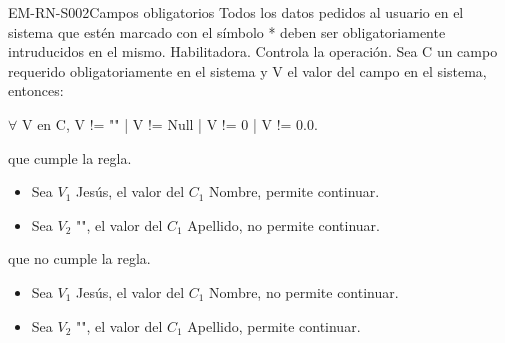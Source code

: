 \begin{BussinesRule}{EM-RN-S002}{Campos obligatorios}
	\BRitem[Descripción:]Todos los datos pedidos al usuario en el sistema
	que estén marcado con el símbolo * deben ser obligatoriamente intruducidos en el mismo.
	\BRitem[Tipo:] Habilitadora.
	\BRitem[Nivel:] Controla la operación.
	\BRitem[Sentencia:] Sea C un campo requerido obligatoriamente en el sistema y V el valor del campo en el sistema, entonces: 
		\begin{center}
			$\forall$ V en C, V != "" | V != Null | V != 0 | V != 0.0.
		\end{center}
	 que cumple la regla.
		\begin{itemize}
			\item Sea $V_{1}$ Jesús, el valor del $C_{1}$ Nombre, permite continuar.
			\item Sea $V_{2}$ "", el valor del $C_{1}$ Apellido, no permite continuar.
		\end{itemize}
	 que no cumple la regla.
		\begin{itemize}
			\item Sea $V_{1}$ Jesús, el valor del $C_{1}$ Nombre, no permite continuar.
			\item Sea $V_{2}$ "", el valor del $C_{1}$ Apellido, permite continuar.
		\end{itemize}
\end{BussinesRule}

